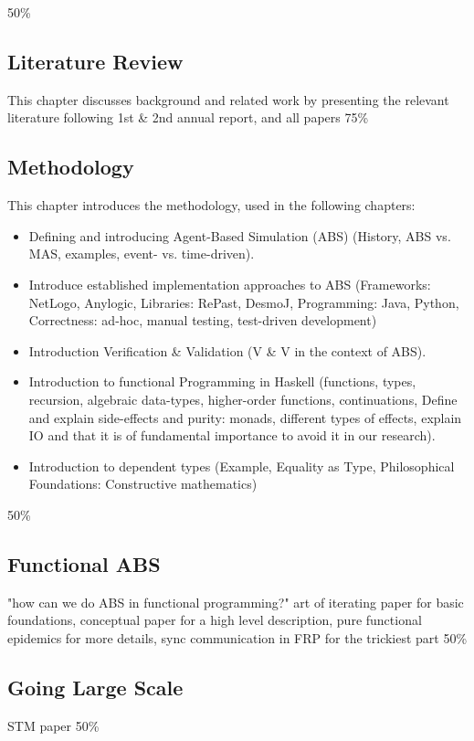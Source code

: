 50\%

\subsection{Literature Review}
This chapter discusses background and related work by presenting the relevant literature
following 1st \& 2nd annual report, and all papers
75\%

\subsection{Methodology}
This chapter introduces the methodology, used in the following chapters:

\begin{itemize}
	\item Defining and introducing Agent-Based Simulation (ABS) (History, ABS vs. MAS, examples, event- vs. time-driven).
	\item Introduce established implementation approaches to ABS (Frameworks: NetLogo, Anylogic, Libraries: RePast, DesmoJ, Programming: Java, Python, Correctness: ad-hoc, manual testing, test-driven development)
	\item Introduction Verification \& Validation (V \& V in the context of ABS).
	\item Introduction to functional Programming in Haskell (functions, types, recursion, algebraic data-types, higher-order functions, continuations, Define and explain side-effects and purity: monads, different types of effects, explain IO and that it is of fundamental importance to avoid it in our research).
	\item Introduction to dependent types (Example, Equality as Type, Philosophical Foundations: Constructive mathematics)
\end{itemize}
50\%

\subsection{Functional ABS}
"how can we do ABS in functional programming?" art of iterating paper for basic foundations, conceptual paper for a high level description, pure functional epidemics for more details, sync communication in FRP for the trickiest part
50\%

\subsection{Going Large Scale}
STM paper
50\%

